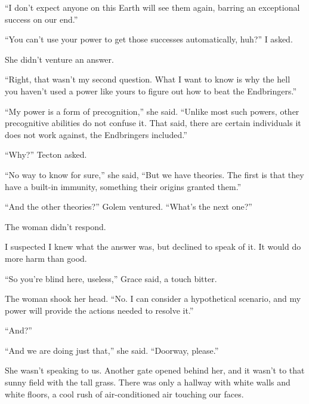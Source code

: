 ``I don't expect anyone on this Earth will see them again, barring an exceptional success on our end.''



``You can't use your power to get those successes automatically, huh?'' I asked.



She didn't venture an answer.



``Right, that wasn't my second question.  What I want to know is why the hell you haven't used a power like yours to figure out how to beat the Endbringers.''



``My power is a form of precognition,'' she said.  ``Unlike most such powers, other precognitive abilities do not confuse it.  That said, there are certain individuals it does not work against, the Endbringers included.''



``Why?'' Tecton asked.



``No way to know for sure,'' she said, ``But we have theories.  The first is that they have a built-in immunity, something their origins granted them.''



``And the other theories?'' Golem ventured.  ``What's the next one?''



The woman didn't respond.



I suspected I knew what the answer was, but declined to speak of it.  It would do more harm than good.



``So you're blind here, useless,'' Grace said, a touch bitter.



The woman shook her head.  ``No.  I can consider a hypothetical scenario, and my power will provide the actions needed to resolve it.''



``And?''



``And we are doing just that,'' she said.  ``Doorway, please.''



She wasn't speaking to us.  Another gate opened behind her, and it wasn't to that sunny field with the tall grass.  There was only a hallway with white walls and white floors, a cool rush of air-conditioned air touching our faces.



